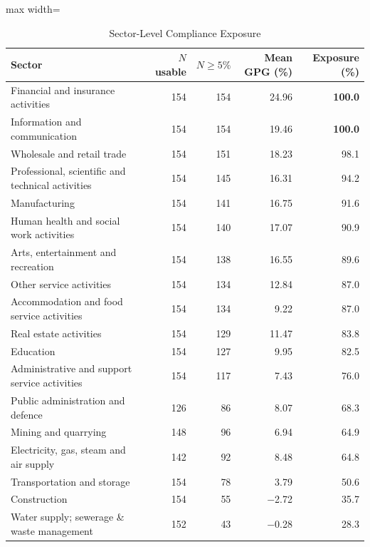 \documentclass[12pt,a4paper]{article}
\begin{document}
\begin{table}[htbp]
\caption{Sector-Level Compliance Exposure}
\label{tab:sectorexposure}
\begin{threeparttable}
\begin{adjustbox}{max width=\textwidth}
\begin{tabular}{p{8.5cm}rrrr}
\toprule
Sector & $N$ usable & $N \geq 5\%$ & Mean GPG (\%) & Exposure (\%) \\
\midrule
Financial and insurance activities                & 154 & 154 & 24.96 & \textbf{100.0} \\
Information and communication                     & 154 & 154 & 19.46 & \textbf{100.0} \\
Wholesale and retail trade                        & 154 & 151 & 18.23 & 98.1 \\
Professional, scientific and technical activities & 154 & 145 & 16.31 & 94.2 \\
Manufacturing                                     & 154 & 141 & 16.75 & 91.6 \\
Human health and social work activities           & 154 & 140 & 17.07 & 90.9 \\
Arts, entertainment and recreation                & 154 & 138 & 16.55 & 89.6 \\
Other service activities                          & 154 & 134 & 12.84 & 87.0 \\
Accommodation and food service activities         & 154 & 134 &  9.22 & 87.0 \\
Real estate activities                            & 154 & 129 & 11.47 & 83.8 \\
Education                                         & 154 & 127 &  9.95 & 82.5 \\
Administrative and support service activities     & 154 & 117 &  7.43 & 76.0 \\
Public administration and defence                 & 126 &  86 &  8.07 & 68.3 \\
Mining and quarrying                              & 148 &  96 &  6.94 & 64.9 \\
Electricity, gas, steam and air supply            & 142 &  92 &  8.48 & 64.8 \\
Transportation and storage                        & 154 &  78 &  3.79 & 50.6 \\
Construction                                      & 154 &  55 & $-$2.72 & 35.7 \\
Water supply; sewerage \& waste management        & 152 &  43 & $-$0.28 & 28.3 \\

\end{tabular}
\end{adjustbox}
\end{threeparttable}
\end{table}
\end{document}
